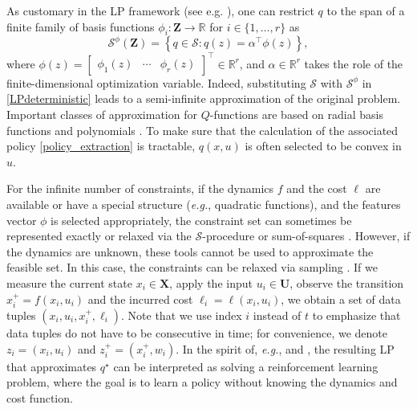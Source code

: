 \documentclass[journal,twoside,web]{ieeecolor}
\newcommand{\Sc}{\mathcal{S}}
\newcommand{\Xb}{\mathbf{X}}
\newcommand{\Ub}{\mathbf{U}}
\newcommand{\Zb}{\mathbf{Z}}
\begin{document}
As customary in the LP framework (see e.g. \cite{deFariasLPapproach}), one can restrict $q$ to the span of a finite family of basis functions $\phi_i : \Zb \to \mathbb{R}$ for $i\in \{1,\ldots,r\}$ as
%
\begin{equation} \label{basis_functions}
	\Sc^{\phi} (\Zb) =  \left \{ q\in\Sc : q(z)=\alpha^\top \phi (z) \right\},
\end{equation} 
%
where $\phi(z) = \begin{bmatrix} \phi_1(z) & \cdots & \phi_r(z) \end{bmatrix}^\top \in \mathbb{R}^r$, and $\alpha \in \mathbb{R}^r$ takes the role of the finite-dimensional optimization variable. Indeed, substituting $ \Sc $ with $ \Sc^{\phi}$ in \eqref{LPdeterministic} leads to a semi-infinite approximation of the original problem.
Important classes of approximation for $Q$-functions are based on radial basis functions and polynomials \cite{SuttonRLanIntroduction, BertsekasVol2, SummersSumofSquares}. To make sure that the calculation of the associated policy \eqref{policy_extraction} is tractable, $q(x,u)$ is often selected to be convex in $u$.

For the infinite number of constraints, if the dynamics $f$ and the cost $\ell$ are available or have a special structure (\textit{e.g.}, quadratic functions), and the features vector $\phi$ is selected appropriately, the constraint set can sometimes be represented exactly or relaxed via the $\Sc$-procedure or sum-of-squares \cite{WangIteratedBellInequalities, SummersSumofSquares}.
However, if the dynamics are unknown, these tools cannot be used to approximate the feasible set. 
In this case, the constraints can be relaxed via sampling \cite{deFariasConstraintSampling}.
If we measure the current state $x_i \in \Xb$, apply the input $u_i \in \Ub$, observe the transition $x_i^+ = f(x_i, u_i)$ and the incurred cost $\ell_i=\ell(x_i, u_i)$, we obtain a set of data tuples $(x_i,u_i,x_i^+,\ell_i)$. Note that we use index $i$ instead of $t$ to emphasize that data tuples do not have to be consecutive in time; for convenience, we denote $z_i=(x_i,u_i)$ and $z_i^+=(x_i^+,w_i)$. In the spirit of, \textit{e.g.}, \cite{GoranADP} and \cite{RelaxedBellmanOp}, the resulting LP that approximates $q^\star$ can be interpreted as solving a reinforcement learning problem, where the goal is to learn a policy without knowing the dynamics and cost function. 
\end{document}
